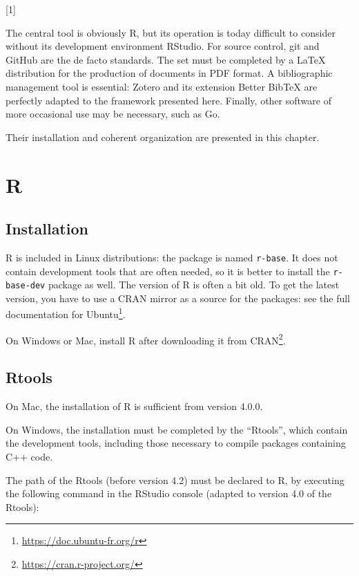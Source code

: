 \documentclass[
  12pt,
  american,
  a4paper,
  extrafontsizes,onecolumn,openright
  ]{memoir}
\newenvironment{Shaded}{\begin{snugshade}}{\end{snugshade}}
\newcommand{\AttributeTok}[1]{\textcolor[rgb]{0.13,0.29,0.53}{#1}}
\newcommand{\CommentTok}[1]{\textcolor[rgb]{0.56,0.35,0.01}{\textit{#1}}}
\newcommand{\FunctionTok}[1]{\textcolor[rgb]{0.13,0.29,0.53}{\textbf{#1}}}
\newcommand{\NormalTok}[1]{#1}
\newcommand{\SpecialCharTok}[1]{\textcolor[rgb]{0.81,0.36,0.00}{\textbf{#1}}}
\newcommand{\StringTok}[1]{\textcolor[rgb]{0.31,0.60,0.02}{#1}}
\newlength{\rf}
\newcommand{\toc}[1]{%
  \startcontents[chapters]%
  \printcontents[chapters]{}{1}[#1]{}%
  ~\newline%
}
\begin{document}
\toc{1}

The central tool is obviously R, but its operation is today difficult to consider without its development environment RStudio.
For source control, git and GitHub are the de facto standards.
The set must be completed by a LaTeX distribution for the production of documents in PDF format.
A bibliographic management tool is essential: Zotero and its extension Better BibTeX are perfectly adapted to the framework presented here.
Finally, other software of more occasional use may be necessary, such as Go.

Their installation and coherent organization are presented in this chapter.

\section{R}\label{r}

\subsection{Installation}\label{installation}

R is included in Linux distributions: the package is named \texttt{r-base}.
It does not contain development tools that are often needed, so it is better to install the \texttt{r-base-dev} package as well.
The version of R is often a bit old.
To get the latest version, you have to use a CRAN mirror as a source for the packages: see the full documentation for Ubuntu\footnote{\url{https://doc.ubuntu-fr.org/r}}.

On Windows or Mac, install R after downloading it from CRAN\footnote{\url{https://cran.r-project.org/}}.

\subsection{Rtools}\label{rtools}

On Mac, the installation of R is sufficient from version 4.0.0.

On Windows, the installation must be completed by the \enquote{Rtools}, which contain the development tools, including those necessary to compile packages containing C++ code.

The path of the Rtools (before version 4.2) must be declared to R, by executing the following command in the RStudio console (adapted to version 4.0 of the Rtools):

\scriptsize

\begin{Shaded}
\end{Shaded}
\end{document}

